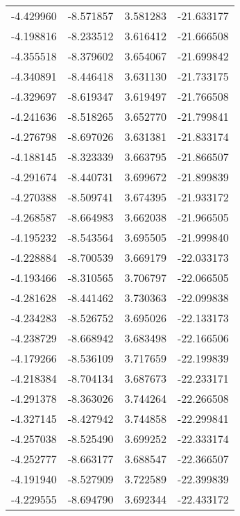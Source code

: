 \begin{tabular}{rrrr}
       -4.429960 &        -8.571857 &    3.581283 & -21.633177 \\
       -4.198816 &        -8.233512 &    3.616412 & -21.666508 \\
       -4.355518 &        -8.379602 &    3.654067 & -21.699842 \\
       -4.340891 &        -8.446418 &    3.631130 & -21.733175 \\
       -4.329697 &        -8.619347 &    3.619497 & -21.766508 \\
       -4.241636 &        -8.518265 &    3.652770 & -21.799841 \\
       -4.276798 &        -8.697026 &    3.631381 & -21.833174 \\
       -4.188145 &        -8.323339 &    3.663795 & -21.866507 \\
       -4.291674 &        -8.440731 &    3.699672 & -21.899839 \\
       -4.270388 &        -8.509741 &    3.674395 & -21.933172 \\
       -4.268587 &        -8.664983 &    3.662038 & -21.966505 \\
       -4.195232 &        -8.543564 &    3.695505 & -21.999840 \\
       -4.228884 &        -8.700539 &    3.669179 & -22.033173 \\
       -4.193466 &        -8.310565 &    3.706797 & -22.066505 \\
       -4.281628 &        -8.441462 &    3.730363 & -22.099838 \\
       -4.234283 &        -8.526752 &    3.695026 & -22.133173 \\
       -4.238729 &        -8.668942 &    3.683498 & -22.166506 \\
       -4.179266 &        -8.536109 &    3.717659 & -22.199839 \\
       -4.218384 &        -8.704134 &    3.687673 & -22.233171 \\
       -4.291378 &        -8.363026 &    3.744264 & -22.266508 \\
       -4.327145 &        -8.427942 &    3.744858 & -22.299841 \\
       -4.257038 &        -8.525490 &    3.699252 & -22.333174 \\
       -4.252777 &        -8.663177 &    3.688547 & -22.366507 \\
       -4.191940 &        -8.527909 &    3.722589 & -22.399839 \\
       -4.229555 &        -8.694790 &    3.692344 & -22.433172 \\

\end{tabular}
